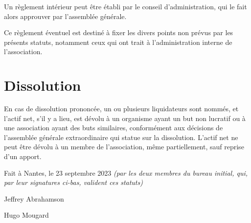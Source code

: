 \documentclass[11 pt]{article}
\begin{document}
Un règlement intérieur peut être établi par le conseil
d’administration, qui le fait alors approuver par l’assemblée
générale.

Ce règlement éventuel est destiné à fixer les divers points non prévus
par les présents statuts, notamment ceux qui ont trait à
l’administration interne de l’association.

\section{Dissolution}

En cas de dissolution prononcée, un ou plusieurs liquidateurs sont
nommés, et l’actif net, s’il y a lieu, est dévolu à un organisme ayant
un but non lucratif ou à une association ayant des buts similaires,
conformément aux décisions de l’assemblée générale extraordinaire qui
statue sur la dissolution. L’actif net ne peut être dévolu à un membre
de l’association, même partiellement, sauf reprise d’un apport.


\vspace{5 mm}
Fait à Nantes, le 23 septembre 2023 \textit{(par
    les deux membres du bureau initial, qui, par leur signatures
    ci-bas, valident ces statuts)}

\vspace{1 cm}
Jeffrey Abrahamson

\vspace{1 cm}
Hugo Mougard
\end{document}
